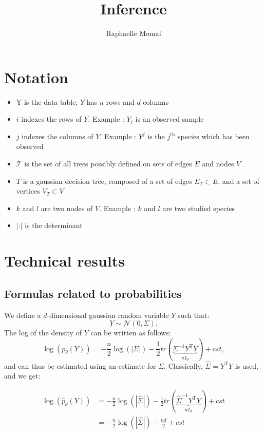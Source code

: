 \documentclass[a4paper,11pt]{article}
\title{Inference}
\author{Raphaelle Momal}
\begin{document}
\maketitle
\tableofcontents

\section{Notation}
\begin{itemize}
 \item Y is the data table, $Y$ has $n$ rows and $d$ columns
 \item $i$ indexes the rows of $Y$. Example : $Y_i$ is an observed sample
 \item $j$ indexes the columns of $Y$. Example : $Y^j$ is the $j^\text{th}$ species which has been observed
  \item $\mathcal{T}$ is the set of all trees possibly defined on sets of edges $E$ and nodes $V$
  \item $T$ is a gaussian decision tree, composed of a set of edges $E_T\subset E$, and a set of vertices $V_T \subset V$
 \item $k$ and $l$ are two nodes of $V$. Example : $k$ and $l$ are two studied species
 \item $|\cdot|$ is the determinant
\end{itemize}

\section{Technical results}
  \subsection{Formulas related to probabilities}
  We define a $d$-dimensional gaussian random variable $Y$ such that:
  \[ Y \sim \mathcal{N}(0,\Sigma).\]
 The log of the density of $Y$ can be written as follows:
 \[ \log(p_\theta(Y)) =  -\frac{n}{2}\log(|\Sigma|) - \frac{1}{2}tr(\underbrace{\Sigma^{-1}Y^{\text{T}}Y}_{nI_d}) + cst,\]
 and can thus be estimated using an estimate for  $\Sigma$. Classically, $ \hat{\Sigma} =Y^{\text{T}}Y$ is used, and we get:
  
   \begin{align*}
   \log(\hat{p}_\theta(Y)) & =-\frac{n}{2}\log(|\hat{\Sigma}|) - \frac{1}{2}tr(\underbrace{\hat{\Sigma}^{-1}Y^{\text{T}}Y}_{nI_d}) + cst\\
    &=-\frac{n}{2}\log(|\hat{\Sigma}|)-\frac{nd}{2} + cst
  \end{align*}
 
\end{document}
